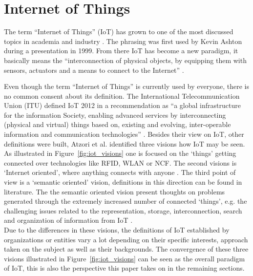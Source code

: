 \section{Internet of Things}
\label{sec:iot}
	The term ``Internet of Things'' (IoT) has grown to one of the most discussed topics in academia and industry \cite{ju}. The phrasing was first used by Kevin Ashton during a presentation in 1999. From there IoT has become a new paradigm, it basically means the ``interconnection of physical objects, by equipping them with sensors, actuators and a means to connect to the Internet'' \cite{dijkman}.

	Even though the term ``Internet of Things'' is currently used by everyone, there is no common consent about its definition. The International Telecommunication Union (ITU) defined IoT 2012 in a recommendation as ``a global infrastructure for the information Society, enabling advanced services by interconnecting (physical and virtual) things based on, existing and evolving, inter-operable information and communication technologies'' \cite{itu}. Besides their view on IoT, other definitions were built, Atzori et al. identified three visions how IoT may be seen. As illustrated in Figure~\ref{fig:iot_visions} one is focused on the `things' getting connected over technologies like RFID, WLAN or NCF. The second visions is `Internet oriented', where anything connects with anyone . The third point of view is a `semantic oriented' vision, definitions in this direction can be found in literature. The the semantic oriented vision present thoughts on problems generated through the extremely increased number of connected `things', e.g. the challenging issues related to the representation, storage, interconnection, search and organization of information from IoT \cite{atzori}.\\
	Due to the differences in these visions, the definitions of IoT established by organizations or entities vary a lot depending on their specific interests, approach taken on the subject as well as their backgrounds. The convergence of these three visions illustrated in Figure~\ref{fig:iot_visions} can be seen as the overall paradigm of IoT, this is also the perspective this paper takes  on in the remaining sections. 

